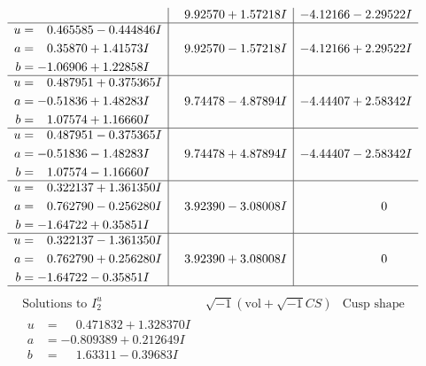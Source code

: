 \documentclass[1p]{elsarticle_modified}
\theoremstyle{definition}
\newcommand{\I}{\sqrt{-1}}
\begin{document}
$$\begin{array}{c|c|c}
 & \phantom{-}9.92570 + 1.57218 I & -4.12166 - 2.29522 I \\ \hline\begin{aligned}
u &= \phantom{-}0.465585 - 0.444846 I \\
a &= \phantom{-}0.35870 + 1.41573 I \\
b &= -1.06906 + 1.22858 I\end{aligned}
 & \phantom{-}9.92570 - 1.57218 I & -4.12166 + 2.29522 I \\ \hline\begin{aligned}
u &= \phantom{-}0.487951 + 0.375365 I \\
a &= -0.51836 + 1.48283 I \\
b &= \phantom{-}1.07574 + 1.16660 I\end{aligned}
 & \phantom{-}9.74478 - 4.87894 I & -4.44407 + 2.58342 I \\ \hline\begin{aligned}
u &= \phantom{-}0.487951 - 0.375365 I \\
a &= -0.51836 - 1.48283 I \\
b &= \phantom{-}1.07574 - 1.16660 I\end{aligned}
 & \phantom{-}9.74478 + 4.87894 I & -4.44407 - 2.58342 I \\ \hline\begin{aligned}
u &= \phantom{-}0.322137 + 1.361350 I \\
a &= \phantom{-}0.762790 - 0.256280 I \\
b &= -1.64722 + 0.35851 I\end{aligned}
 & \phantom{-}3.92390 - 3.08008 I & \phantom{-0.000000 } 0 \\ \hline\begin{aligned}
u &= \phantom{-}0.322137 - 1.361350 I \\
a &= \phantom{-}0.762790 + 0.256280 I \\
b &= -1.64722 - 0.35851 I\end{aligned}
 & \phantom{-}3.92390 + 3.08008 I & \phantom{-0.000000 } 0\\
 \hline 
 \end{array}$$\newpage$$\begin{array}{c|c|c}  
\text{Solutions to }I^u_{2}& \I (\text{vol} + \sqrt{-1}CS) & \text{Cusp shape}\\
 \hline 
\begin{aligned}
u &= \phantom{-}0.471832 + 1.328370 I \\
a &= -0.809389 + 0.212649 I \\
b &= \phantom{-}1.63311 - 0.39683 I\end{aligned}

\end{array}$$
\end{document}
